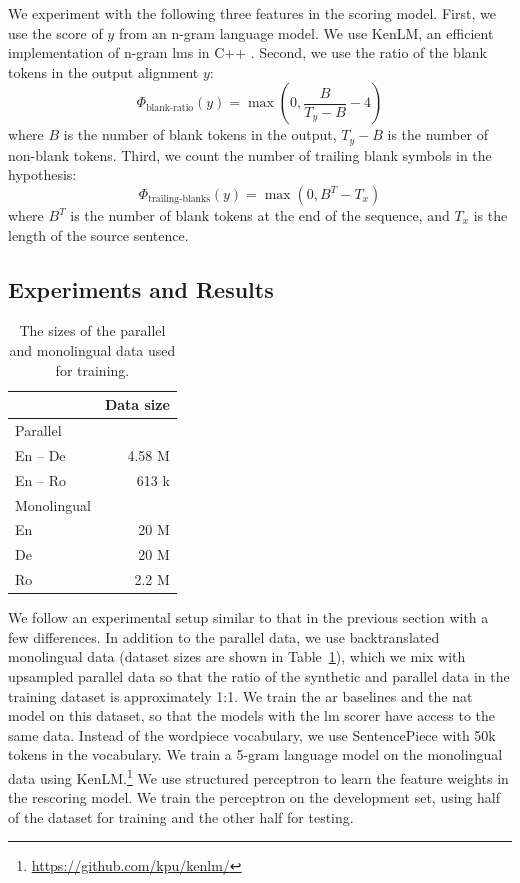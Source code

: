 We experiment with the following three features in the scoring model. First, we
use the score of $y$ from an n-gram language model. We use KenLM, an efficient
implementation of n-gram \acp{lm} in C++
\citep{heafield-2011-kenlm}. Second,
we use the ratio of the blank tokens in the output alignment $y$:
%
\begin{equation}
  \Phi_{\text{blank-ratio}}(y) = \max(0, \frac{B}{T_y - B} - 4 )
\end{equation}
%
where $B$ is the number of blank tokens in the output, $T_y - B$ is the number
of non-blank tokens. Third, we count the number of trailing blank symbols in
the hypothesis:
%
\begin{equation}
  \Phi_{\text{trailing-blanks}}(y) = \max(0, B^T - T_x)
\end{equation}
%
where $B^T$ is the number of blank tokens at the end of the sequence, and $T_x$
is the length of the source sentence.

\subsection{Experiments and Results}


\begin{table}
  \centering
  \begin{tabular}{lr}
    \toprule
    & Data size \\
    \midrule
    Parallel & \\
    En -- De & 4.58 M \\
    En -- Ro & 613 k \\
    \addlinespace
    Monolingual & \\
    En & 20 M \\
    De & 20 M \\
    Ro & 2.2 M \\
    \bottomrule
  \end{tabular}

  \caption{The sizes of the parallel and monolingual data used for training.}%
  \label{tab:ngrams:data}
\end{table}

We follow an experimental setup similar to that in the previous section with a
few differences. In addition to the parallel data, we use backtranslated
monolingual data (dataset sizes are shown in Table~\ref{tab:ngrams:data}),
which we mix with upsampled parallel data so that the ratio of the synthetic
and parallel data in the training dataset is approximately 1:1. We train the
\ac{ar} baselines and the \ac{nat} model on this dataset, so that the models
with the \ac{lm} scorer have access to the same data.  Instead of the wordpiece
vocabulary, we use SentencePiece \citep{kudo-richardson-2018-sentencepiece}
with 50k tokens in the vocabulary.  We train a 5-gram language model on the
monolingual data using KenLM.\footnote{\url{https://github.com/kpu/kenlm/}} We
use structured perceptron \citep{huang-etal-2012-structured} to learn the
feature weights in the rescoring model. We train the perceptron on the
development set, using half of the dataset for training and the other half for
testing.

